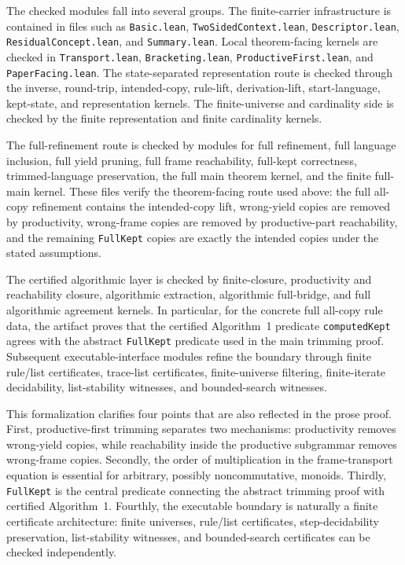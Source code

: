 \documentclass[sub]{jalc}
\begin{document}
The checked modules fall into several groups.  The finite-carrier infrastructure
is contained in files such as \texttt{Basic.lean},
\texttt{TwoSidedContext.lean}, \texttt{Descriptor.lean},
\texttt{ResidualConcept.lean}, and \texttt{Summary.lean}.  Local theorem-facing
kernels are checked in \texttt{Transport.lean}, \texttt{Bracketing.lean},
\texttt{ProductiveFirst.lean}, and \texttt{PaperFacing.lean}.  The
state-separated representation route is checked through the inverse,
round-trip, intended-copy, rule-lift, derivation-lift, start-language,
kept-state, and representation kernels.  The finite-universe and cardinality
side is checked by the finite representation and finite cardinality kernels.

The full-refinement route is checked by modules for full refinement, full
language inclusion, full yield pruning, full frame reachability, full-kept
correctness, trimmed-language preservation, the full main theorem kernel, and
the finite full-main kernel.  These files verify the theorem-facing route used
above: the full all-copy refinement contains the intended-copy lift,
wrong-yield copies are removed by productivity, wrong-frame copies are removed
by productive-part reachability, and the remaining \texttt{FullKept} copies are
exactly the intended copies under the stated assumptions.

The certified algorithmic layer is checked by finite-closure, productivity and
reachability closure, algorithmic extraction, algorithmic full-bridge, and full
algorithmic agreement kernels.  In particular, for the concrete full all-copy
rule data, the artifact proves that the certified Algorithm~1 predicate
\texttt{computedKept} agrees with the abstract \texttt{FullKept} predicate used
in the main trimming proof.  Subsequent executable-interface modules refine the
boundary through finite rule/list certificates, trace-list certificates,
finite-universe filtering, finite-iterate decidability, list-stability
witnesses, and bounded-search witnesses.

This formalization clarifies four points that are also reflected in the prose
proof.  First, productive-first trimming separates two mechanisms: productivity
removes wrong-yield copies, while reachability inside the productive subgrammar
removes wrong-frame copies.  Secondly, the order of multiplication in the
frame-transport equation is essential for arbitrary, possibly noncommutative,
monoids.  Thirdly, \texttt{FullKept} is the central predicate connecting the
abstract trimming proof with certified Algorithm~1.  Fourthly, the executable
boundary is naturally a finite certificate architecture: finite universes,
rule/list certificates, step-decidability preservation, list-stability
witnesses, and bounded-search certificates can be checked independently.
\end{document}
